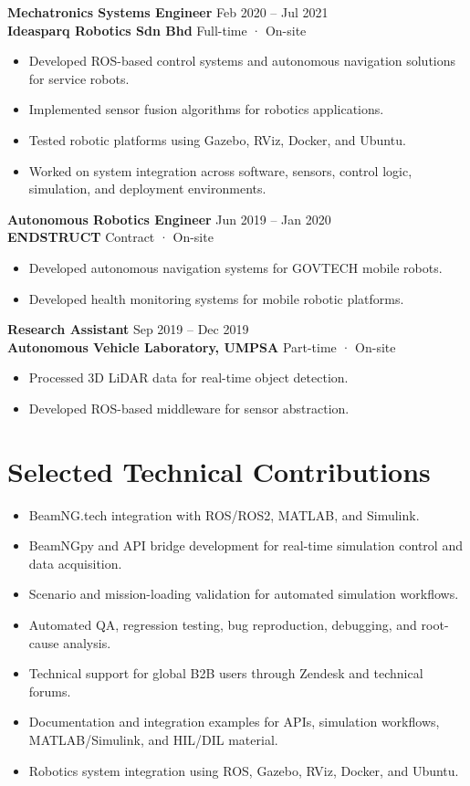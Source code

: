 \documentclass[11pt,a4paper]{article}
\begin{document}
\textbf{Mechatronics Systems Engineer} \hfill Feb 2020 -- Jul 2021\\
\textbf{Ideasparq Robotics Sdn Bhd} \hfill Full-time · On-site

\begin{itemize}
    \item Developed ROS-based control systems and autonomous navigation solutions for service robots.
    \item Implemented sensor fusion algorithms for robotics applications.
    \item Tested robotic platforms using Gazebo, RViz, Docker, and Ubuntu.
    \item Worked on system integration across software, sensors, control logic, simulation, and deployment environments.
\end{itemize}

\textbf{Autonomous Robotics Engineer} \hfill Jun 2019 -- Jan 2020\\
\textbf{ENDSTRUCT} \hfill Contract · On-site

\begin{itemize}
    \item Developed autonomous navigation systems for GOVTECH mobile robots.
    \item Developed health monitoring systems for mobile robotic platforms.
\end{itemize}

\textbf{Research Assistant} \hfill Sep 2019 -- Dec 2019\\
\textbf{Autonomous Vehicle Laboratory, UMPSA} \hfill Part-time · On-site

\begin{itemize}
    \item Processed 3D LiDAR data for real-time object detection.
    \item Developed ROS-based middleware for sensor abstraction.
\end{itemize}

\section*{Selected Technical Contributions}

\begin{itemize}
    \item BeamNG.tech integration with ROS/ROS2, MATLAB, and Simulink.
    \item BeamNGpy and API bridge development for real-time simulation control and data acquisition.
    \item Scenario and mission-loading validation for automated simulation workflows.
    \item Automated QA, regression testing, bug reproduction, debugging, and root-cause analysis.
    \item Technical support for global B2B users through Zendesk and technical forums.
    \item Documentation and integration examples for APIs, simulation workflows, MATLAB/Simulink, and HIL/DIL material.
    \item Robotics system integration using ROS, Gazebo, RViz, Docker, and Ubuntu.
\end{itemize}
\end{document}
